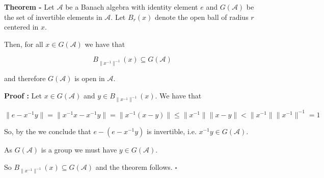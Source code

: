 \documentclass[12pt]{article}
\begin{document}
{\bf Theorem -} Let $\mathcal{A}$ be a Banach algebra with identity element $e$ and $G(\mathcal{A})$ be the set of invertible elements in $\mathcal{A}$. Let $B_r(x)$ denote the open ball of radius $r$ centered in $x$.

Then, for all $x \in G(\mathcal{A})$ we have that

\begin{displaymath}
B_{\|x^{-1}\|^{-1}}(x) \subseteq G(\mathcal{A})
\end{displaymath}

and therefore $G(\mathcal{A})$ is open in $\mathcal{A}$.

{\bf Proof :} Let $x \in G(\mathcal{A})$ and $y \in B_{\|x^{-1}\|^{-1}}(x)$. We have that

\begin{displaymath}
\|e-x^{-1}y\| = \|x^{-1}x-x^{-1}y\| = \|x^{-1}(x-y)\| \le \|x^{-1}\|\|x-y\| < \|x^{-1}\|\|x^{-1}\|^{-1} = 1
\end{displaymath}

So, by the  we conclude that $e-(e-x^{-1}y)$ is invertible,
 i.e. $x^{-1}y \in G(\mathcal{A})$.

As $G(\mathcal{A})$ is a group we must have $y \in G(\mathcal{A})$.

So $B_{\|x^{-1}\|^{-1}}(x) \subseteq G(\mathcal{A})$ and the theorem follows. $\square$
\end{document}
